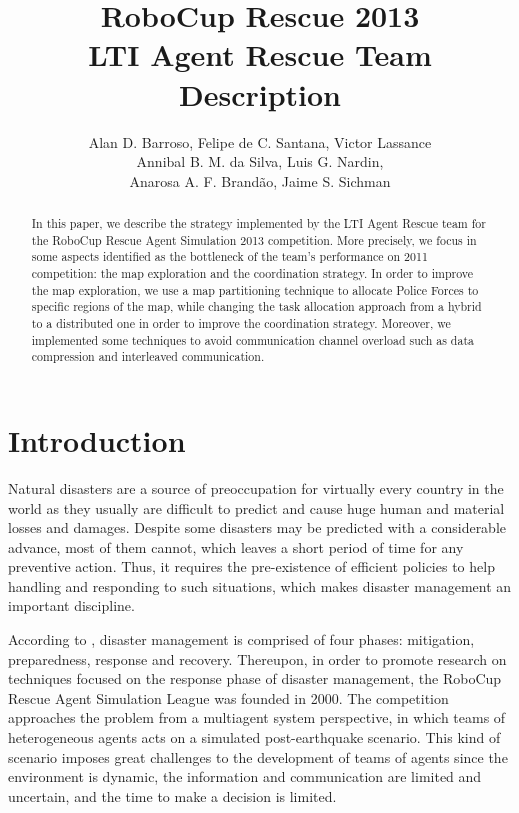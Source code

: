 \documentclass{llncs}
\begin{document}
\title{RoboCup Rescue 2013\\
       LTI Agent Rescue Team Description}
\author{Alan D. Barroso, Felipe de C. Santana, Victor Lassance\\
				Annibal B. M. da Silva, Luis G. Nardin,\\
        Anarosa A. F. Brand{\~a}o, Jaime S. Sichman}
\maketitle
\begin{abstract}
In this paper, we describe the strategy implemented by the LTI Agent Rescue team for the RoboCup Rescue Agent Simulation 2013 competition. More precisely, we focus in some aspects identified as the bottleneck of the team's performance on 2011 competition: the map exploration and the coordination strategy. In order to improve the map exploration, we use a map partitioning technique to allocate Police Forces to specific regions of the map, while changing the task allocation approach from a hybrid to a distributed one in order to improve the coordination strategy. Moreover, we implemented some techniques to avoid communication channel overload such as data compression and interleaved communication.
\end{abstract}
\section{Introduction}
\label{sec:introduction}
Natural disasters are a source of preoccupation for virtually every country in the world as they usually are difficult to predict and cause huge human and material losses and damages. Despite some disasters may be predicted with a considerable advance, most of them cannot, which leaves a short period of time for any preventive action. Thus, it requires the pre-existence of efficient policies to help handling and responding to such situations, which makes disaster management an important discipline. 

According to \cite{blanchardEtAl2007}, disaster management is comprised of four phases: mitigation, preparedness, response and recovery. Thereupon, in order to promote research on techniques focused on the response phase of disaster management, the RoboCup Rescue Agent Simulation League \cite{kitanoEtAl1999} was founded in 2000. The competition approaches the problem from a multiagent system perspective, in which teams of heterogeneous agents acts on a simulated post-earthquake scenario. This kind of scenario imposes great challenges to the development of teams of agents since the environment is dynamic, the information and communication are limited and uncertain, and the time to make a decision is limited.
\end{document}
